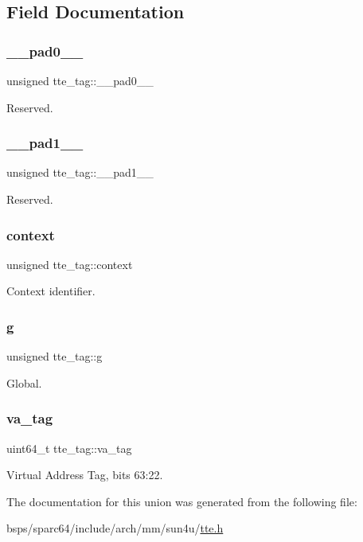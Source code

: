 \subsection{Field Documentation}
\mbox{\label{uniontte__tag_aee13aa963a6f199e62cac0e1ca0c7c13}} 
\subsubsection{\texorpdfstring{\_\_pad0\_\_}{\_\_pad0\_\_}}
{\footnotesize\ttfamily unsigned tte\+\_\+tag\+::\+\_\+\+\_\+pad0\+\_\+\+\_\+}

Reserved. \mbox{\label{uniontte__tag_a4509c462936a4ab721fce11ce6b91db0}} 
\subsubsection{\texorpdfstring{\_\_pad1\_\_}{\_\_pad1\_\_}}
{\footnotesize\ttfamily unsigned tte\+\_\+tag\+::\+\_\+\+\_\+pad1\+\_\+\+\_\+}

Reserved. \mbox{\label{uniontte__tag_a34594afc45da74386d5f3a62f9b7b74d}} 
\subsubsection{\texorpdfstring{context}{context}}
{\footnotesize\ttfamily unsigned tte\+\_\+tag\+::context}

Context identifier. \mbox{\label{uniontte__tag_a59807e347c45e491f17610936ed56a0e}} 
\subsubsection{\texorpdfstring{g}{g}}
{\footnotesize\ttfamily unsigned tte\+\_\+tag\+::g}

Global. \mbox{\label{uniontte__tag_a9c17eef4040ab382b9ce67bcb34683cb}} 
\subsubsection{\texorpdfstring{va\_tag}{va\_tag}}
{\footnotesize\ttfamily uint64\+\_\+t tte\+\_\+tag\+::va\+\_\+tag}

Virtual Address Tag, bits 63\+:22. 

The documentation for this union was generated from the following file\+:\begin{DoxyCompactItemize}
\item 
bsps/sparc64/include/arch/mm/sun4u/\mbox{\hyperlink{sun4u_2tte_8h}{tte.\+h}}\end{DoxyCompactItemize}

